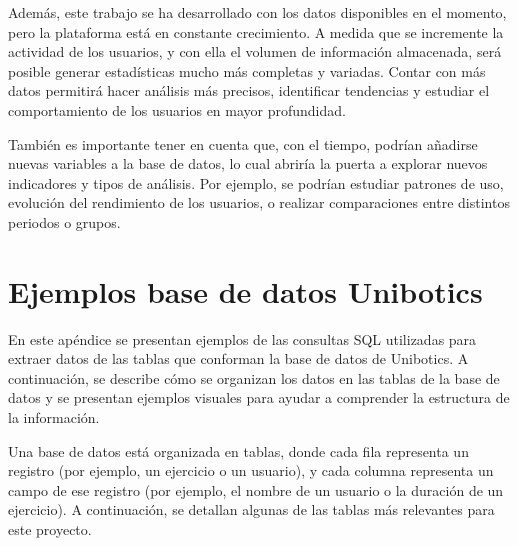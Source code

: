 \documentclass[a4paper, 12pt]{book}
\begin{document}
Además, este trabajo se ha desarrollado con los datos disponibles en el momento, pero la plataforma está en constante crecimiento. A medida que se incremente la actividad de los usuarios, y con ella el volumen de información almacenada, será posible generar estadísticas mucho más completas y variadas. Contar con más datos permitirá hacer análisis más precisos, identificar tendencias y estudiar el comportamiento de los usuarios en mayor profundidad.

También es importante tener en cuenta que, con el tiempo, podrían añadirse nuevas variables a la base de datos, lo cual abriría la puerta a explorar nuevos indicadores y tipos de análisis. Por ejemplo, se podrían estudiar patrones de uso, evolución del rendimiento de los usuarios, o realizar comparaciones entre distintos periodos o grupos.



\printglossary[type=\acronymtype]

\printglossary


\cleardoublepage
\appendix
\chapter{Ejemplos base de datos Unibotics}
\label{sec:appA}


En este apéndice se presentan ejemplos de las consultas SQL utilizadas para extraer datos de las tablas que conforman la base de datos de Unibotics. A continuación, se describe cómo se organizan los datos en las tablas de la base de datos y se presentan ejemplos visuales para ayudar a comprender la estructura de la información.

Una base de datos está organizada en tablas, donde cada fila representa un registro (por ejemplo, un ejercicio o un usuario), y cada columna representa un campo de ese registro (por ejemplo, el nombre de un usuario o la duración de un ejercicio). A continuación, se detallan algunas de las tablas más relevantes para este proyecto.
\end{document}
